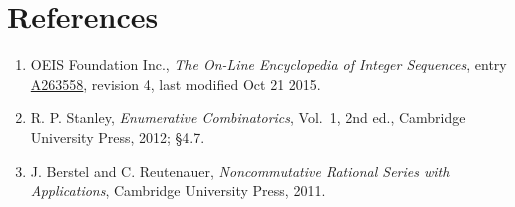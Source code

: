 \documentclass[11pt]{article}
\theoremstyle{definition}
\begin{document}
\section{References}

\begin{enumerate}

\item OEIS Foundation Inc., \emph{The On-Line Encyclopedia of Integer Sequences}, entry \href{https://oeis.org/A263558}{A263558}, revision 4, last modified Oct 21 2015.

\item R. P. Stanley, \emph{Enumerative Combinatorics}, Vol.~1, 2nd ed., Cambridge University Press, 2012; \S4.7.

\item J. Berstel and C. Reutenauer, \emph{Noncommutative Rational Series with Applications}, Cambridge University Press, 2011.

\end{enumerate}
\end{document}
